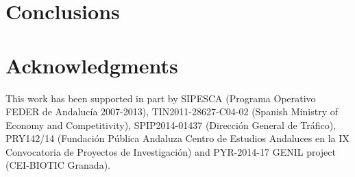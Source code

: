 \documentclass[runningheads,a4paper]{llncs}
\begin{document}
\section{Conclusions}


\section*{Acknowledgments} %
\scriptsize{This work has been supported in part by SIPESCA (Programa Operativo FEDER de Andaluc\'ia 2007-2013), TIN2011-28627-C04-02 (Spanish Ministry of Economy and Competitivity), SPIP2014-01437 (Direcci\'on General de Tr\'afico), PRY142/14 (Fundaci\'on P\'ublica Andaluza Centro de Estudios Andaluces en la IX Convocatoria de Proyectos de Investigaci\'on) and PYR-2014-17 GENIL project (CEI-BIOTIC Granada).}


%




\end{document}
